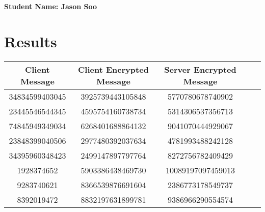 \documentclass[11pt]{article}
\begin{document}
	\textbf{Student Name: Jason Soo}
	\section{Results} %
	\label{sec:Results}
		
	
		\begin{tabular}{|c|c|c|c|c|}
		\hline
		 \textbf{Client Message} & \textbf{Client Encrypted Message} & \textbf{Server Encrypted Message}\\
		\hline
		 34834599403045 & 3925739443105848 & 5770780678740902\\
		\hline
		 23445546544345 & 4595754160738734 & 5314306537356713\\
		 \hline
		 74845949349034 & 6268401688864132 & 9041070444929067\\
		\hline
		 23848399040506 & 2977480392037634 & 4781993488242128\\
		\hline
		34395960348423 & 2499147897797764 & 8272756782409429\\
		\hline
		1928374652 & 5903386438469730 & 10089197097459013\\
		\hline
		9283740621 & 8366539876691604 & 2386773178549737\\
		\hline
		8392019472 & 8832197631899781 & 9386966290554574\\
		\hline
		\end{tabular}
	
\end{document}
